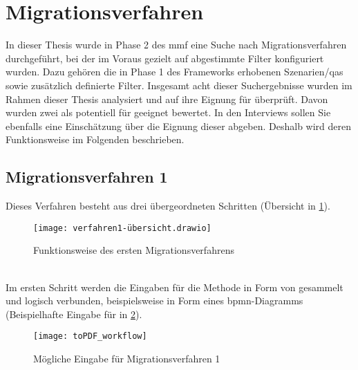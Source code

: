 \section{Migrationsverfahren}

In dieser Thesis wurde in Phase 2 des \gls{mmf} eine Suche nach Migrationsverfahren durchgeführt, bei der im Voraus gezielt auf \jf abgestimmte Filter konfiguriert wurden.
Dazu gehören die in Phase 1 des Frameworks erhobenen Szenarien/\glspl{qa} sowie zusätzlich definierte Filter. 
Insgesamt acht dieser Suchergebnisse wurden im Rahmen dieser Thesis analysiert und auf ihre Eignung für \jf überprüft.
Davon wurden zwei als potentiell für \jf geeignet bewertet.
In den Interviews sollen Sie ebenfalls eine Einschätzung über die Eignung dieser abgeben.
Deshalb wird deren Funktionsweise im Folgenden beschrieben.

\subsection{Migrationsverfahren 1}

Dieses Verfahren besteht aus drei übergeordneten Schritten (Übersicht in \cref{fig:interviews-migrationsverfahren1}).
\begin{figure}[!ht]
	\centering
	\texttt{[image: verfahren1-übersicht.drawio]}
	\caption[Funktionsweise Migrationsverfahren 1]{
		Funktionsweise des ersten Migrationsverfahrens
	}
	\label{fig:interviews-migrationsverfahren1}
\end{figure} \\
Im ersten Schritt werden die Eingaben für die Methode in Form von  gesammelt und logisch verbunden, beispielsweise in Form eines \gls{bpmn}-Diagramms (Beispielhafte Eingabe für \jf in \cref{fig:interview-eingabe-verfahren1}).

\begin{figure}[!ht]
	\centering
	\texttt{[image: toPDF\_workflow]}
	\caption[Mögliche Eingabe Migrationsverfahren 1]{
		Mögliche Eingabe für Migrationsverfahren 1
	}
	\label{fig:interview-eingabe-verfahren1}
\end{figure}

